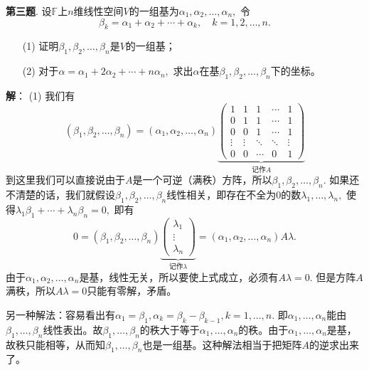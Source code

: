 \fi  %

\newpageorvspace

{\bf 第三题}. 设$\mathbb{F}$上$n$维线性空间$V$的一组基为$\alpha_1, \alpha_2, \ldots, \alpha_n,$ 令
$$\beta_k = \alpha_1 + \alpha_2 + \cdots + \alpha_k, \quad k = 1, 2, \ldots, n.$$
\begin{itemize}
\item[(1)] 证明$\beta_1, \beta_2, \ldots, \beta_n$是$V$的一组基；
\item[(2)] 对于$\alpha = \alpha_1 + 2 \alpha_2 + \cdots + n \alpha_n,$ 求出$\alpha$在基$\beta_1, \beta_2, \ldots, \beta_n$下的坐标。
\end{itemize}

\ifIncludeAnswer

\newpageorvspace

{\bf 解}： (1) 我们有
$$(\beta_1, \beta_2, \ldots, \beta_n) = (\alpha_1, \alpha_2, \ldots, \alpha_n) \underbrace{ \begin{pmatrix} 1 & 1 & 1 & \cdots & 1 \\ 0 & 1 & 1 & \cdots & 1 \\ 0 & 0 & 1 & \cdots & 1 \\ \vdots & \vdots & \ddots & \ddots & \vdots \\ 0 & 0 & \cdots & 0 & 1 \end{pmatrix} }_{\text{记作} A}$$
到这里我们可以直接说由于$A$是一个可逆（满秩）方阵，所以$\beta_1, \beta_2, \ldots, \beta_n.$ 如果还不清楚的话，我们就假设$\beta_1, \beta_2, \ldots, \beta_n$线性相关，即存在不全为0的数$\lambda_1, \ldots, \lambda_n,$ 使得$\lambda_1 \beta_1 + \cdots + \lambda_n \beta_n = 0,$ 即有
$$0 = (\beta_1, \beta_2, \ldots, \beta_n) \underbrace{ \begin{pmatrix} \lambda_1 \\ \vdots \\ \lambda_n \end{pmatrix} }_{\text{记作} \lambda} = (\alpha_1, \alpha_2, \ldots, \alpha_n) A \lambda.$$
由于$\alpha_1, \alpha_2, \ldots, \alpha_n$是基，线性无关，所以要使上式成立，必须有$A\lambda = 0.$ 但是方阵$A$满秩，所以$A\lambda = 0$只能有零解，矛盾。

另一种解法：容易看出有$\alpha_1 = \beta_1, \alpha_k = \beta_k - \beta_{k-1}, k = 1, \ldots, n.$ 即$\alpha_1, \ldots, \alpha_n$能由$\beta_1, \ldots, \beta_n$线性表出。故$\beta_1, \ldots, \beta_n$的秩大于等于$\alpha_1, \ldots, \alpha_n$的秩。由于$\alpha_1, \ldots, \alpha_n$是基，故秩只能相等，从而知$\beta_1, \ldots, \beta_n$也是一组基。这种解法相当于把矩阵$A$的逆求出来了。

